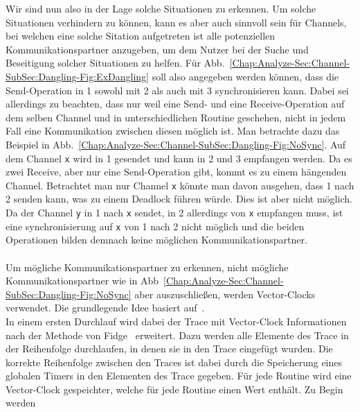 Wir sind nun also in der Lage solche Situationen zu erkennen. Um solche Situationen verhindern 
zu können, kann es aber auch sinnvoll sein für Channels, bei welchen eine solche Sitation aufgetreten ist 
alle potenziellen Kommunikationspartner anzugeben, um dem Nutzer bei der Suche und Beseitigung 
solcher Situationen zu helfen. Für Abb.~\ref{Chap:Analyze-Sec:Channel-SubSec:Dangling-Fig:ExDangling}
soll also angegeben werden können, dass die Send-Operation in 1 sowohl mit 2 als auch mit 3 
synchronisieren kann. Dabei sei allerdings zu beachten, dass nur weil eine Send- und eine 
Receive-Operation auf dem selben Channel und in unterschiedlichen Routine geschehen, nicht 
in jedem Fall eine Kommunikation zwischen diesen möglich ist. Man betrachte dazu das Beispiel in 
Abb.~\ref{Chap:Analyze-Sec:Channel-SubSec:Dangling-Fig:NoSync}.
Auf dem Channel \texttt{x} wird in 1 gesendet und kann in 2 und 3 empfangen werden. Da es zwei Receive, 
aber nur eine Send-Operation gibt, kommt es zu einem hängenden Channel. Betrachtet man nur 
Channel \texttt{x} könnte man davon ausgehen, dass 1 nach 2 senden kann, was zu einem Deadlock
führen würde. Dies ist aber nicht möglich. Da der Channel \texttt{y} in 1 nach \texttt{x} sendet, 
in 2 allerdings von \texttt{x} empfangen muss, ist eine synchronisierung auf \texttt{x} von 1 nach 
2 nicht möglich und die beiden Operationen bilden demnach keine möglichen Kommunikationspartner.\\\\
Um mögliche Kommunikationspartner zu erkennen, nicht mögliche Kommunikationspartner wie in 
Abb~\ref{Chap:Analyze-Sec:Channel-SubSec:Dangling-Fig:NoSync} aber auszuschließen, werden
Vector-Clocks verwendet. Die grundlegende Idee basiert auf~\cite{PPDP18}.\\
In einem ersten Durchlauf wird dabei der Trace mit Vector-Clock Informationen nach der Methode 
von Fidge~\cite{Fidge} erweitert. Dazu werden alle Elemente des Trace in der Reihenfolge durchlaufen, 
in denen sie in den Trace eingefügt wurden. Die korrekte Reihenfolge zwischen den Traces ist dabei 
durch die Speicherung eines globalen Timers in den Elementen des Trace gegeben. Für jede Routine 
wird eine Vector-Clock gespeichter, welche für jede Routine einen Wert enthält. Zu Begin werden 
